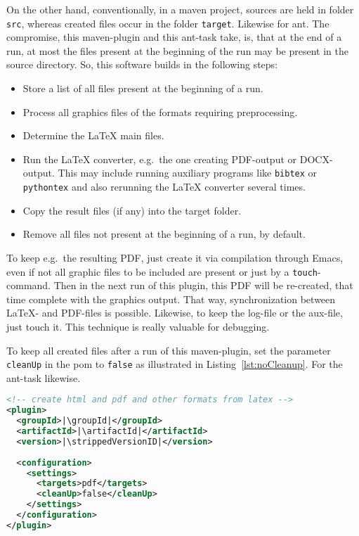 On the other hand, 
conventionally, in a maven project, 
sources are held in folder \texttt{src}, 
whereas created files occur in the folder \texttt{target}. 
Likewise for ant. 
The compromise, this maven-plugin and this ant-task take, 
is, that at the end of a run, 
at most the files present at the beginning of the run 
may be present in the source directory. 
So, this software builds in the following steps: 
%
\begin{itemize}
\item
Store a list of all files present at the beginning of a run.
\item
Process all graphics files of the formats requiring preprocessing.
\item
Determine the \LaTeX{} main files.
\item
Run the \LaTeX{} converter, e.g.~the one creating PDF-output or DOCX-output.
This may include running auxiliary programs like \texttt{bibtex} or \texttt{pythontex} 
and also rerunning the \LaTeX{} converter several times. 
\item
Copy the result files (if any) into the target folder.
\item
Remove all files not present at the beginning of a run, by default. 
\end{itemize}

To keep e.g.~the resulting PDF, 
just create it via compilation through Emacs, 
even if not all graphic files to be included are present 
or just by a \texttt{touch}-command. 
Then in the next run of this plugin, 
this PDF will be re-created, 
that time complete with the graphics output. 
That way, synchronization between \LaTeX- and PDF-files is possible. 
Likewise, to keep the log-file or the aux-file, just touch it. 
This technique is really valuable for debugging. 

To keep all created files after a run of this maven-plugin, 
set the parameter \texttt{cleanUp} in the pom 
to \texttt{false} as illustrated in Listing~\ref{lst:noCleanup}. 
For the ant-task likewise. 

\begin{lstlisting}[language=xml, basicstyle=\small,
escapechar=|,
float=b, captionpos=b, label={lst:noCleanup},
caption={Configuration without cleanup}]
<!-- create html and pdf and other formats from latex -->
<plugin>
  <groupId>|\groupId|</groupId>
  <artifactId>|\artifactId|</artifactId>
  <version>|\strippedVersionID|</version>
	
  <configuration>
    <settings>
      <targets>pdf</targets>
      <cleanUp>false</cleanUp>
    </settings>
  </configuration>
</plugin>
\end{lstlisting}


